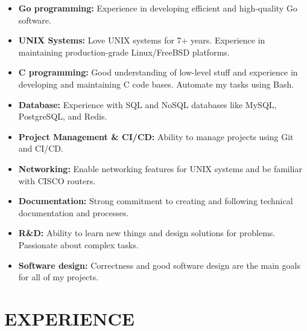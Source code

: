 \documentclass{engineercv}
\begin{document}
\begin{itemize}
  \item \textbf{Go programming:} Experience in developing efficient and high-quality Go software.
  \item \textbf{UNIX Systems:}  Love UNIX systems for 7+ years. Experience in maintaining production-grade Linux/FreeBSD platforms.
  \item \textbf{C programming:} Good understanding of low-level stuff and experience in developing and maintaining C code bases.
    Automate my tasks using Bash.
  \item \textbf{Database:} Experience with SQL and NoSQL databases like MySQL, PostgreSQL, and Redis.
  \item \textbf{Project Management \& CI/CD:} Ability to manage projects using Git and CI/CD.
  \item \textbf{Networking:} Enable networking features for UNIX systems and be familiar with CISCO routers.
  \item \textbf{Documentation:} Strong commitment to creating and following technical documentation and processes.
  \item \textbf{R\&D:} Ability to learn new things and design solutions for problems. Passionate about complex tasks.
  \item \textbf{Software design:} Correctness and good software design are the main goals for all of my projects.
\end{itemize}

\section{EXPERIENCE}
\end{document}
